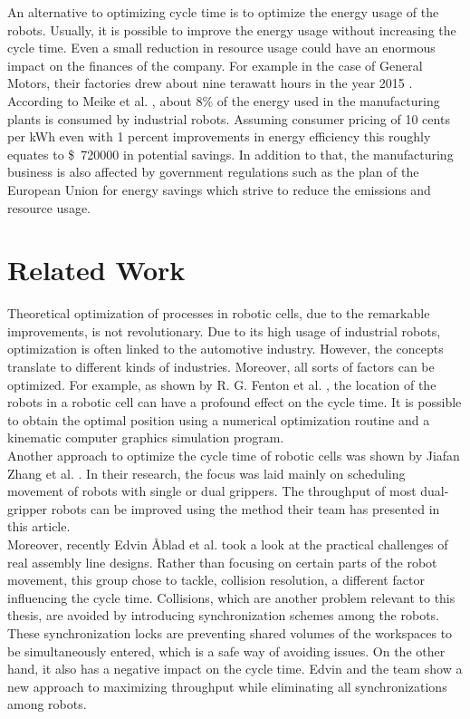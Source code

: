 An alternative to optimizing cycle time is to optimize the energy usage of the robots. 
Usually, it is possible to improve the energy usage without increasing the cycle time.
Even a small reduction in resource usage could have an enormous impact on the finances of the company.
For example in the case of General Motors, their factories drew about nine terawatt hours in the year 2015 \cite{GMEnergySpending}.
According to Meike et al. \cite{Meike8Percent}, about 8\% of the energy used in the manufacturing plants is consumed by industrial robots. 
Assuming consumer pricing of 10 cents per kWh even with 1 percent improvements in energy efficiency this roughly equates to \$~720000 in potential savings. 
In addition to that, the manufacturing business is also affected by government regulations such as the plan of the European Union for energy savings \cite{EUElectricity} which strive to reduce the emissions and resource usage. \\

\section{Related Work}

Theoretical optimization of processes in robotic cells, due to the remarkable improvements, is not revolutionary. 
Due to its high usage of industrial robots, optimization is often linked to the automotive industry. 
However, the concepts translate to different kinds of industries. 
Moreover, all sorts of factors can be optimized. 
For example, as shown by R. G. Fenton et al. \cite{OptimizationCycleTimeFenton}, the location of the robots in a robotic cell can have a profound effect on the cycle time. 
It is possible to obtain the optimal position using a numerical optimization routine and a kinematic computer graphics simulation program. \\

Another approach to optimize the cycle time of robotic cells was shown by Jiafan Zhang et al. \cite{OptimizationCycleTimeZhang}. In their research, the focus was laid mainly on scheduling movement of robots with single or dual grippers. The throughput of most dual-gripper robots can be improved using the method their team has presented in this article. \\

Moreover, recently Edvin Åblad et al. \cite{CollisionAvoidanceAblad} took a look at the practical challenges of real assembly line designs. 
Rather than focusing on certain parts of the robot movement, this group chose to tackle, collision resolution, a different factor influencing the cycle time. 
Collisions, which are another problem relevant to this thesis, are avoided by introducing synchronization schemes among the robots. 
These synchronization locks are preventing shared volumes of the workspaces to be simultaneously entered, which is a safe way of avoiding issues. 
On the other hand, it also has a negative impact on the cycle time. 
Edvin and the team show a new approach to maximizing throughput while eliminating all synchronizations among robots. \\

